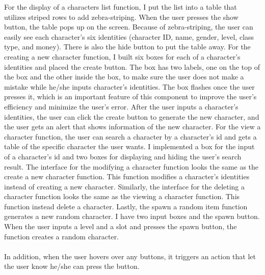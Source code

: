 \documentclass[100pt]{article}
\begin{document}
\large{
For the display of a characters list function, I put the list into a table that utilizes striped rows to add zebra-striping. When the user presses the show button, the table pops up on the screen. Because of zebra-striping, the user can easily see each character's six identities (character ID, name, gender, level, class type, and money). There is also the hide button to put the table away. For the creating a new character function, I built six boxes for each of a character's identities and placed the create button. The box has two labels, one on the top of the box and the other inside the box, to make sure the user does not make a mistake while he/she inputs character's identities. The box flashes once the user presses it, which is an important feature of this component to improve the user's efficiency and minimize the user's error. After the user inputs a character's identities, the user can click the create button to generate the new character, and the user gets an alert that shows information of the new character. For the view a character function, the user can search a character by a character's id and gets a table of the specific character the user wants. I implemented a box for the input of a character's id and two boxes for displaying and hiding the user's search result. The interface for the modifying a character function looks the same as the create a new character function. This function modifies a character's identities instead of creating a new character. Similarly, the interface for the deleting a character function looks the same as the viewing a character function. This function instead delete a character. Lastly, the spawn a random item function generates a new random character. I have two input boxes and the spawn button. When the user inputs a level and a slot and presses the spawn button, the function creates a random character.
\\\\
In addition, when the user hovers over any buttons, it triggers an action that let the user know he/she can press the button. 

}
\end{document}
